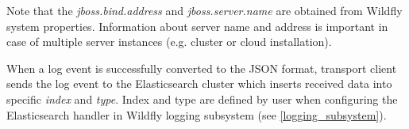 \documentclass[12pt,oneside]{fithesis2}
\begin{document}
Note that the \textit{jboss.bind.address} and \textit{jboss.server.name} are obtained from Wildfly system properties. Information about server name and address is important in case of multiple server instances (e.g. cluster or cloud installation).

When a log event is successfully converted to the JSON format, transport client sends the log event to the Elasticsearch cluster which inserts received data into specific \textit{index} and \textit{type}. Index and type are defined by user when configuring the Elasticsearch handler in Wildfly logging subsystem (see \ref{logging_subsystem}).



\end{document}
